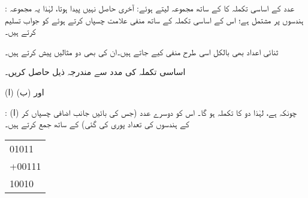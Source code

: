 :\quad 
عدد  کے اساسی تکملہ  کا  کے ساتھ مجموعہ لیتے ہوئے:  آخری حاصل  نہیں پیدا ہوتا، لہٰذا یہ مجموعہ 
  ہندسوں پر مشتمل ہے؛ اس کے اساسی تکملہ  کے ساتھ منفی علامت چسپاں کرتے ہوئے  کو جواب تسلیم کرتے ہیں۔
\begin{center}
\begin{otherlanguage}{english}
\quad\quad
{}\quad\quad
{}\quad\quad
{}
\end{otherlanguage}
\end{center}

ثنائی اعداد بھی بالکل اسی طرح منفی کیے جاتے ہیں۔ان کی بھی دو مثالیں پیش کرتے ہیں۔
	

 اساسی تکملہ کی مدد سے مندرجہ ذیل حاصل کریں۔
 
(ا)  اور (ب) 

:\quad
(ا) چونکہ  ہے، لہٰذا دو کا تکملہ  ہو گا۔ اس کو دوسرے عدد  (جس کی بائیں جانب اضافی  چسپاں کر کے ہندسوں کی تعداد پوری کی گئی) کے ساتھ جمع کرتے ہیں۔
\begin{center}
\begin{otherlanguage}{english}
\begin{tabular}{L}
\phantom{+}01011\\
+00111\\
\midrule
\phantom{+}10010
\end{tabular}
\end{otherlanguage}
\end{center}

